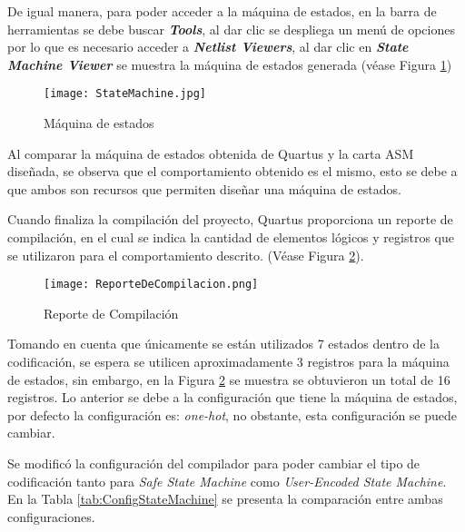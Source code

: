\documentclass{article}
\begin{document}
De igual manera, para poder acceder a la máquina de estados, en la barra de herramientas se debe buscar \textbf{\textit{Tools}}, al dar clic se despliega un menú de opciones por lo que es necesario acceder a \textbf{\textit{Netlist Viewers}}, al dar clic en \textbf{\textit{State Machine Viewer}} se muestra la máquina de estados generada (véase Figura \ref{fig:StateMachine})
\begin{figure}[h]
    \centering
    \texttt{[image: StateMachine.jpg]}
    \caption{\label{fig:StateMachine}Máquina de estados}
\end{figure}

Al comparar la máquina de estados obtenida de Quartus y la carta ASM diseñada, se observa que el comportamiento obtenido es el mismo, esto se debe a que ambos son recursos que permiten diseñar una máquina de estados.

Cuando finaliza la compilación del proyecto, Quartus proporciona un reporte de compilación, en el cual se indica la cantidad de elementos lógicos y registros que se utilizaron para el comportamiento descrito. (Véase Figura \ref{fig:ReporteDeCompilacion}).
\begin{figure}[h!]
    \centering
    \texttt{[image: ReporteDeCompilacion.png]}
    \caption{\label{fig:ReporteDeCompilacion}Reporte de Compilación}
\end{figure}

Tomando en cuenta que únicamente se están utilizados 7 estados dentro de la codificación, se espera se utilicen aproximadamente 3 registros para la máquina de estados, sin embargo, en la Figura \ref{fig:ReporteDeCompilacion} se muestra se obtuvieron un total de 16 registros. Lo anterior se debe a la configuración que tiene la máquina de estados, por defecto la configuración es: \textit{one-hot}, no obstante, esta configuración se puede cambiar. 

Se modificó la configuración del compilador para poder cambiar el tipo de codificación tanto para \textit{Safe State Machine} como \textit{User-Encoded State Machine}. En la Tabla \ref{tab:ConfigStateMachine} se presenta la comparación entre ambas configuraciones.
\end{document}
